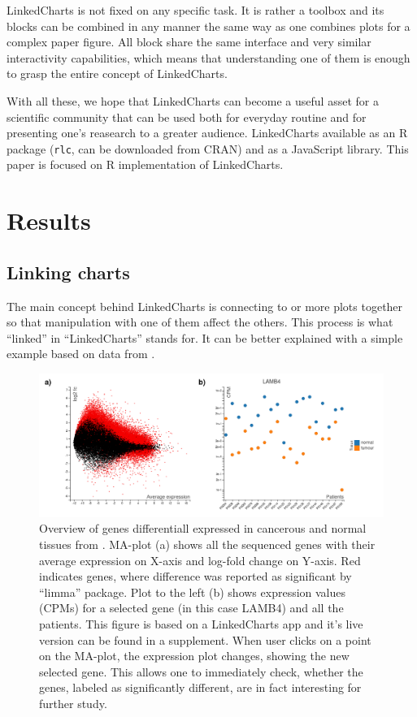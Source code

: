 \documentclass[twocolumn,10pt]{article}
\begin{document}
LinkedCharts is not fixed on any specific task. It is rather a toolbox and its blocks can be combined in any manner the same way as one combines plots for a complex paper figure. All block share the same interface and very similar interactivity capabilities, which means that understanding one of them is enough to grasp the entire concept of LinkedCharts.

With all these, we hope that LinkedCharts can become a useful asset for a scientific community that can be used both for everyday routine and for presenting one's reasearch to a greater audience. LinkedCharts available as an R package (\texttt{rlc}, can be downloaded from CRAN) and as a JavaScript library. This paper is focused on R implementation of LinkedCharts. 

\section{Results}
\subsection{Linking charts}

The main concept behind LinkedCharts is connecting to or more plots together so that manipulation with one of them affect the others. This process is what ``linked'' in ``LinkedCharts'' stands for. It can be better explained with a simple example based on data from \citet{conway_2015}.

\begin{figure}
	\includegraphics[width=\textwidth]{FigD/figD.png}
	\caption{Overview of genes differentiall expressed in cancerous and normal tissues from \citet{conway_2015}. MA-plot (a) shows all the sequenced genes with their average expression on X-axis and log-fold change on Y-axis. Red indicates genes, where difference was reported as significant by ``limma'' package. Plot to the left (b) shows expression values (CPMs) for a selected gene (in this case LAMB4) and all the patients. This figure is based on a LinkedCharts app and it's live version can be found in a supplement. When user clicks on a point on the MA-plot, the expression plot changes, showing the new selected gene. This allows one to immediately check, whether the genes, labeled as significantly different, are in fact interesting for further study.}
	\label{FigD}
\end{figure}
\end{document}
